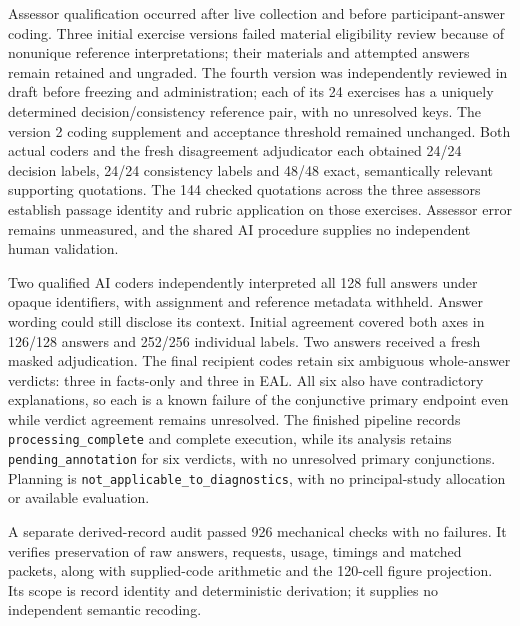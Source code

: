 \documentclass[
  11pt,
]{article}
\begin{document}
Assessor qualification occurred after live collection and before
participant-answer coding. Three initial exercise versions failed
material eligibility review because of nonunique reference
interpretations; their materials and attempted answers remain retained
and ungraded. The fourth version was independently reviewed in draft
before freezing and administration; each of its 24 exercises has a
uniquely determined decision/consistency reference pair, with no
unresolved keys. The version 2 coding supplement and acceptance
threshold remained unchanged. Both actual coders and the fresh
disagreement adjudicator each obtained 24/24 decision labels, 24/24
consistency labels and 48/48 exact, semantically relevant supporting
quotations. The 144 checked quotations across the three assessors
establish passage identity and rubric application on those exercises.
Assessor error remains unmeasured, and the shared AI procedure supplies
no independent human validation.

Two qualified AI coders independently interpreted all 128 full answers
under opaque identifiers, with assignment and reference metadata
withheld. Answer wording could still disclose its context. Initial
agreement covered both axes in 126/128 answers and 252/256 individual
labels. Two answers received a fresh masked adjudication. The final
recipient codes retain six ambiguous whole-answer verdicts: three in
facts-only and three in EAL. All six also have contradictory
explanations, so each is a known failure of the conjunctive primary
endpoint even while verdict agreement remains unresolved. The finished
pipeline records \texttt{processing\_complete} and complete execution,
while its analysis retains \texttt{pending\_annotation} for six
verdicts, with no unresolved primary conjunctions. Planning is
\texttt{not\_applicable\_to\_diagnostics}, with no principal-study
allocation or available evaluation.

A separate derived-record audit passed 926 mechanical checks with no
failures. It verifies preservation of raw answers, requests, usage,
timings and matched packets, along with supplied-code arithmetic and the
120-cell figure projection. Its scope is record identity and
deterministic derivation; it supplies no independent semantic recoding.
\end{document}
